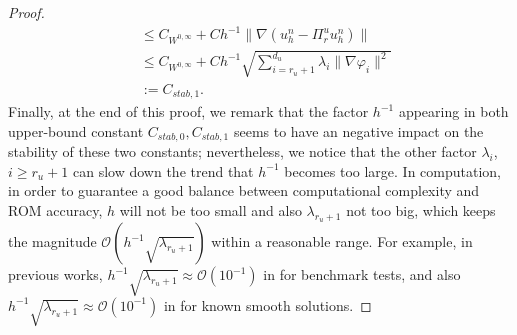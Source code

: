 \documentclass[10pt,twoside,openany,UTF8,CJK]{article}
\begin{document}
\begin{proof}
\begin{equation}
\begin{aligned}
			&\leq C_{W^{0,\infty}} + Ch^{-1}\|\nabla(u^n_h - \Pi^u_r u^n_h)\| \\
			&\leq C_{W^{0,\infty}} + Ch^{-1}\sqrt{\sum^{d_u}_{i=r_u+1}\lambda_{i}\|\nabla\varphi_i\|^2} \\
			&:= C_{stab,1}.
	    \end{aligned}
       \end{equation}	
		\indent Finally, at the end of this proof, we remark that the factor $h^{-1}$ appearing in both upper-bound constant $C_{stab,0},C_{stab,1}$ seems to have an negative impact on the stability of these two constants; nevertheless, we notice that the other factor $\lambda_i$, $i\geq r_u+1$ can slow down the trend that $h^{-1}$ becomes too large. In computation, in order to guarantee a good balance between computational complexity and ROM accuracy, $h$ will not be too small and also $\lambda_{r_u+1}$ not too big, which keeps the magnitude $\mathcal{O}(h^{-1}\sqrt{\lambda_{r_u+1}})$ within a reasonable range. For example, in previous works, $h^{-1}\sqrt{\lambda_{r_u+1}} \approx \mathcal{O}(10^{-1})$ in \cite{POD-LPS-SINUM-2020,POD-LPS-SINUM-2021} for benchmark tests, and also $h^{-1}\sqrt{\lambda_{r_u+1}} \approx \mathcal{O}(10^{-1})$ in \cite{Luo-RO-Extra-2019-JMAA,MyFirstPaper} for known smooth solutions. 		
	\end{proof}	
			
	
		
\end{document}
